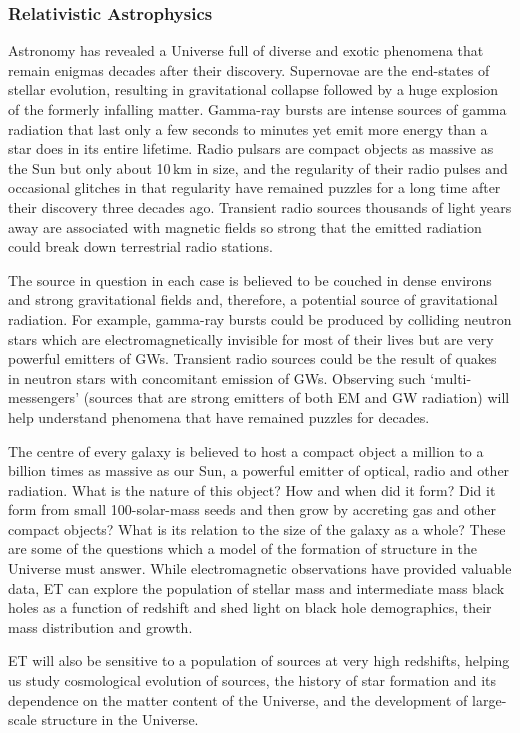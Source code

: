 \subsubsection{Relativistic Astrophysics}
Astronomy has revealed a Universe full of diverse and exotic
phenomena that remain enigmas decades after their discovery.
Supernovae are the end-states of stellar evolution, resulting in
gravitational collapse followed by a huge explosion of the formerly infalling matter.
Gamma-ray bursts are intense sources of gamma radiation that last
only a few seconds to minutes yet emit more energy than a star does
in its entire lifetime.
Radio pulsars are compact objects as massive as the Sun but only
about 10\,km in size, and the regularity of their radio pulses and
occasional glitches in that regularity have remained 
puzzles for a long time after their discovery three decades ago.
Transient radio sources thousands of light years away
are associated with magnetic fields so strong that the emitted radiation
could break down terrestrial radio stations.

The source in question in each case is believed to be couched in
dense environs and strong gravitational fields and, therefore,
a potential source of gravitational radiation. For example, gamma-ray
bursts could be produced by colliding neutron stars which are
electromagnetically invisible for most of their lives but are very
powerful emitters of GWs. Transient radio sources could be the
result of quakes in neutron stars with concomitant emission of GWs.
Observing such `multi-messengers' (sources that are strong emitters of
both EM and GW radiation) will help understand phenomena that
have remained puzzles for decades.

The centre of every galaxy is believed to host a compact
object a million to a billion times as massive as our Sun,
a powerful emitter of optical, radio and other radiation.
What is the nature of this object? How and when did it form?
Did it form from small 100-solar-mass seeds and then grow
by accreting gas and other compact objects? What is its
relation to the size of the galaxy as a whole? These are some
of the questions which a model of the formation of structure in
the Universe must answer.  While electromagnetic observations 
have provided valuable data, ET can explore the population of 
stellar mass and intermediate mass black holes as a function 
of redshift and shed light on black hole demographics, their 
mass distribution and growth.

ET will also be sensitive to
a population of sources at very high redshifts, helping us
study cosmological evolution of sources, the history of star
formation and its dependence on the matter content of
the Universe, and the development of large-scale structure in the
Universe.

